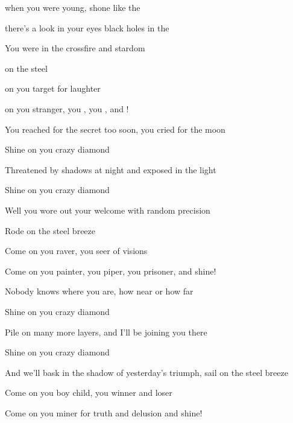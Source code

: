 

\zs
{} when you were young,
 shone like the 

   

 there's a look in your eyes
 black holes in the 

   

You were  in the crossfire
 and stardom

 on the steel 

 on you target for  laughter

 on you stranger, you , you , and !
\ks

      

\zs
You reached for the secret too soon,
you cried for the moon

Shine on you crazy diamond

Threatened by shadows at night
and exposed in the light

Shine on you crazy diamond

Well you wore out your welcome
with random precision

Rode on the steel breeze

Come on you raver, you seer of visions

Come on you painter, you piper, you prisoner, and shine!
\ks

\zs
Nobody knows where you are,
how near or how far

Shine on you crazy diamond

Pile on many more layers,
and I'll be joining you there

Shine on you crazy diamond

And we'll bask in the shadow of yesterday's triumph,
sail on the steel breeze

Come on you boy child, you winner and loser

Come on you miner for truth and delusion and shine!
\ks

\kp





